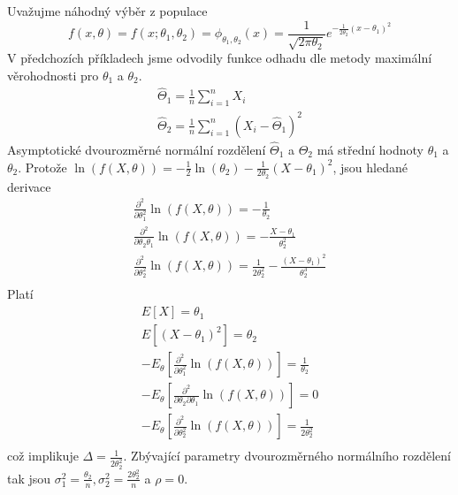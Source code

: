 \begin{example}
Uvažujme náhodný výběr z populace
\begin{equation*}
f(x, \theta) = f(x; \theta_1, \theta_2) = \phi_{\theta_1, \theta_2}(x) = \frac{1}{\sqrt{2 \pi \theta_2}}e^{-\frac{1}{2 \theta_2}(x - \theta_1)^2}
\end{equation*}
V předchozích příkladech jsme odvodily funkce odhadu dle metody maximální věrohodnosti pro $\theta_1$ a $\theta_2$.
\begin{gather*}
\hat{\Theta}_1 = \frac{1}{n}\sum_{i = 1}^n X_i\\
\hat{\Theta}_2 = \frac{1}{n}\sum_{i = 1}^n (X_i - \hat{\Theta}_1)^2
\end{gather*}
Asymptotické dvourozměrné normální rozdělení $\hat{\Theta}_1$ a $\hat{\Theta}_2$ má střední hodnoty $\theta_1$ a $\theta_2$. Protože $\ln(f(X, \theta)) = -\frac{1}{2}\ln(\theta_2) - \frac{1}{2 \theta_2}(X - \theta_1)^2$, jsou hledané derivace
\begin{gather*}
\frac{\partial^2}{\partial \theta_1^2} \ln(f(X, \theta)) = -\frac{1}{\theta_2}\\
\frac{\partial^2}{\partial \theta_2 \theta_1} \ln(f(X, \theta)) = -\frac{X - \theta_1}{\theta_2^2}\\
\frac{\partial^2}{\partial \theta_2^2} \ln(f(X, \theta)) = \frac{1}{2 \theta_2^2} -\frac{(X - \theta_1)^2}{\theta_2^3}\\
\end{gather*}
Platí
\begin{gather*}
E[X] = \theta_1\\
E[(X - \theta_1)^2] = \theta_2\\
-E_{\theta}\left[\frac{\partial^2}{\partial \theta_1^2} \ln(f(X, \theta))\right] = \frac{1}{\theta_2}\\
-E_{\theta}\left[\frac{\partial^2}{\partial \theta_2 \partial \theta_1}\ln(f(X, \theta))\right] = 0\\
-E_{\theta}\left[\frac{\partial^2}{\partial \theta_2^2} \ln(f(X, \theta))\right] = \frac{1}{2\theta_2^2}\\
\end{gather*}
což implikuje $\Delta = \frac{1}{2 \theta_2^2}$. Zbývající parametry dvourozměrného normálního rozdělení tak jsou $\sigma_1^2 = \frac{\theta_2}{n}, \sigma_2^2 = \frac{2 \theta_2^2}{n}$ a $\rho = 0$.
\end{example}


